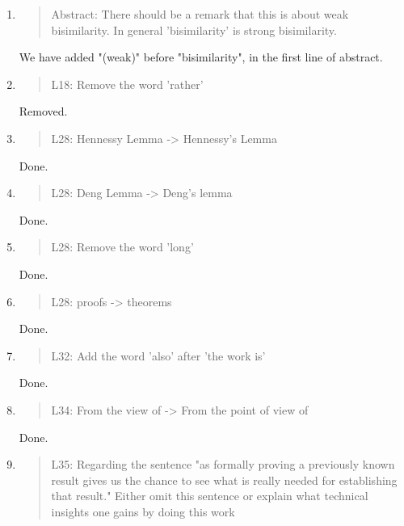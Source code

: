 \begin{enumerate}
\item \begin{quote}
    Abstract:
    There should be a remark that this is about weak bisimilarity. In
    general 'bisimilarity' is strong bisimilarity.
  \end{quote}
  We have added "(weak)" before "bisimilarity", in the first line of abstract.

\item \begin{quote}
    L18: Remove the word 'rather'
  \end{quote}
  Removed.
  
\item \begin{quote}
    L28: Hennessy Lemma -> Hennessy's Lemma
  \end{quote}
  Done.
  
\item \begin{quote}
    L28: Deng Lemma -> Deng's lemma
  \end{quote}
  Done.
  
\item \begin{quote}
    L28: Remove the word 'long'
  \end{quote}
  Done.
  
\item \begin{quote}
    L28: proofs -> theorems
  \end{quote}
  Done.
  
\item \begin{quote}
    L32: Add the word 'also' after 'the work is'
  \end{quote}
  Done.

\item \begin{quote}
    L34: From the view of -> From the point of view of
  \end{quote}
  Done.
  
\item \begin{quote}
    L35: Regarding the sentence "as formally proving a previously known result gives us the chance to see
    what is really needed for establishing that result."
    Either omit this sentence or explain what technical insights one
    gains by doing this work
  \end{quote}


\end{enumerate}
